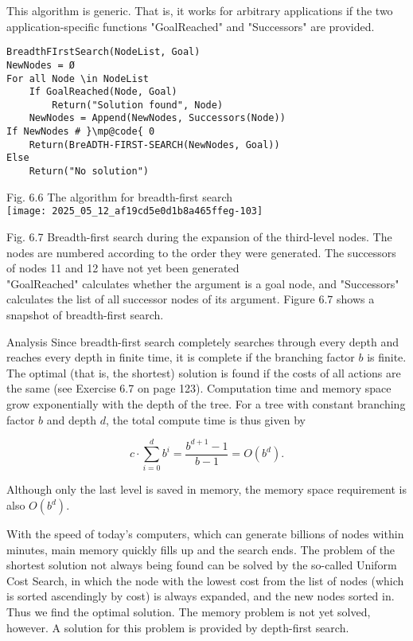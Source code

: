 \documentclass[10pt]{article}
\begin{document}
This algorithm is generic. That is, it works for arbitrary applications if the two application-specific functions "GoalReached" and "Successors" are provided.

\begin{verbatim}
BreadthFIrstSearch(NodeList, Goal)
NewNodes = Ø
For all Node \in NodeList
    If GoalReached(Node, Goal)
        Return("Solution found", Node)
    NewNodes = Append(NewNodes, Successors(Node))
If NewNodes # }\mp@code{ 0
    Return(BreADTH-FIRST-SEARCH(NewNodes, Goal))
Else
    Return("No solution")
\end{verbatim}

Fig. 6.6 The algorithm for breadth-first search\\
\texttt{[image: 2025\_05\_12\_af19cd5e0d1b8a465ffeg-103]}

Fig. 6.7 Breadth-first search during the expansion of the third-level nodes. The nodes are numbered according to the order they were generated. The successors of nodes 11 and 12 have not yet been generated\\
"GoalReached" calculates whether the argument is a goal node, and "Successors" calculates the list of all successor nodes of its argument. Figure 6.7 shows a snapshot of breadth-first search.

Analysis Since breadth-first search completely searches through every depth and reaches every depth in finite time, it is complete if the branching factor $b$ is finite. The optimal (that is, the shortest) solution is found if the costs of all actions are the same (see Exercise 6.7 on page 123). Computation time and memory space grow exponentially with the depth of the tree. For a tree with constant branching factor $b$ and depth $d$, the total compute time is thus given by

$$
c \cdot \sum_{i=0}^{d} b^{i}=\frac{b^{d+1}-1}{b-1}=O\left(b^{d}\right) .
$$

Although only the last level is saved in memory, the memory space requirement is also $O\left(b^{d}\right)$.

With the speed of today's computers, which can generate billions of nodes within minutes, main memory quickly fills up and the search ends. The problem of the shortest solution not always being found can be solved by the so-called Uniform Cost Search, in which the node with the lowest cost from the list of nodes (which is sorted ascendingly by cost) is always expanded, and the new nodes sorted in. Thus we find the optimal solution. The memory problem is not yet solved, however. A solution for this problem is provided by depth-first search.
\end{document}
